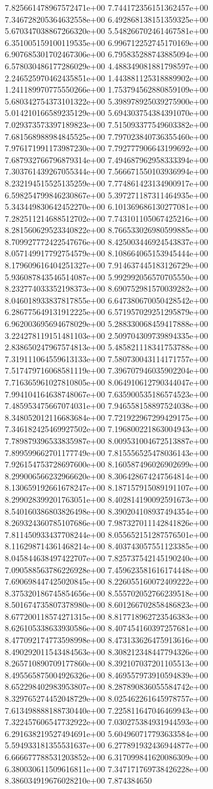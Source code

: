7.825661478967572471e+00	7.744172356151362457e+00	7.346728205364632558e+00	6.492868138151359325e+00	5.670347038867266320e+00	5.548266702461467581e+00	6.351005159100119535e+00	6.996712252745170169e+00	6.907685301702467306e+00	6.795835288743885094e+00	6.578030486177286029e+00	4.488349081881798597e+00	2.246525970462435851e+00	1.443881125318889902e+00	1.241189970775550266e+00	1.753794562880859109e+00	5.680342754373101322e+00	5.398978925039275900e+00	5.014210166589235129e+00	5.694303754384391070e+00	7.029373573397189823e+00	7.515093377549603382e+00	7.681568988984845525e+00	7.797023840736355460e+00	7.976171991173987230e+00	7.792777906643199692e+00	7.687932766796879314e+00	7.494687962958333394e+00	7.303761439267055344e+00	7.566671550103936994e+00	8.232194515525135259e+00	7.774861423134900917e+00	6.598254799846230867e+00	5.397271187311464935e+00	5.343449830642452270e+00	6.101369686130277081e+00	7.282511214688512702e+00	7.743101105067425216e+00	8.281560629523340822e+00	8.766533026980599885e+00	8.709927772422547676e+00	8.425003446924543837e+00	8.057149917792754579e+00	8.108664065153945444e+00	8.179609616404251327e+00	7.914637445183126729e+00	5.936087843546514087e+00	5.992992056570705550e+00	8.232774033352198373e+00	8.690752981570039282e+00	8.046018933837817855e+00	6.647380670050428542e+00	6.286775649131912225e+00	6.571957029251295879e+00	6.962003695694678029e+00	5.288330068459417888e+00	3.224278119151481103e+00	2.509704309739894335e+00	2.838650247967574813e+00	5.485821118341753788e+00	7.319111064559613133e+00	7.580730043114171757e+00	7.517479716068581119e+00	7.396707946035902204e+00	7.716365961027810805e+00	8.064910612790344047e+00	7.994104164638748067e+00	7.635900535186574523e+00	7.485953475667074031e+00	7.946558158897524038e+00	8.348052012116683684e+00	7.721922967299429175e+00	7.346182425469927502e+00	7.196800221863004943e+00	7.789879396533835987e+00	8.009531004672513887e+00	7.899599662701177749e+00	7.815556525478036143e+00	7.926154753728697600e+00	8.160587496026902699e+00	8.299006566232966620e+00	8.306428674247564814e+00	8.130659192661678247e+00	8.187157915089191107e+00	8.299028399201763051e+00	8.402814190092591673e+00	8.540160386803826498e+00	8.390204108937494354e+00	8.269324360785107686e+00	7.987327011142841826e+00	7.811450933437708244e+00	8.055652151287576501e+00	8.116298714361468214e+00	8.403743057551123385e+00	8.045844638497422707e+00	7.825737542145190240e+00	7.090588563786226928e+00	7.459623581616174448e+00	7.690698447425020845e+00	8.226055160072409222e+00	8.375320186745854656e+00	8.555702052766239518e+00	8.501674735807378980e+00	8.601266702858486823e+00	8.677200118574271315e+00	8.817718962723546383e+00	8.626105338633930586e+00	8.407454160397257681e+00	8.477092174773598998e+00	8.473133626475913616e+00	8.490292011543484563e+00	8.308212348447794326e+00	8.265710890709177860e+00	8.392107037201105513e+00	8.495565875004926326e+00	8.469557973910594839e+00	8.652298402983953807e+00	8.287890836055584742e+00	8.329765274452048729e+00	8.025462261645978757e+00	7.613498888188730440e+00	7.225811647046469943e+00	7.322457606547732922e+00	7.030275384931944593e+00	6.291638219527494691e+00	5.604960717793633584e+00	5.594933181355531637e+00	6.277891932436944877e+00	6.666677788531203852e+00	6.317099841620086309e+00	6.380030611509616811e+00	7.347171769738426228e+00	8.386034919676028210e+00	7.874384650